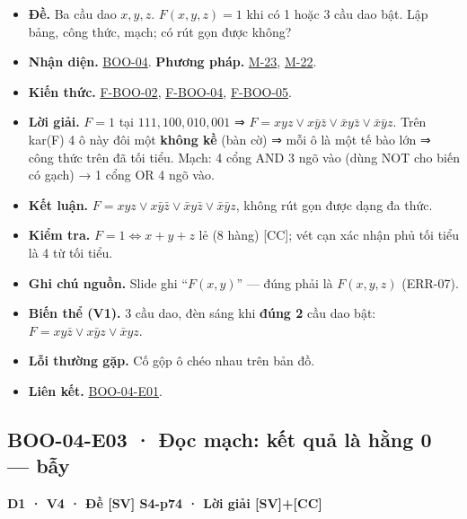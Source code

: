 \documentclass[
  10pt,
  twoside,openany]{book}
\providecommand{\tightlist}{%
  \setlength{\itemsep}{0pt}\setlength{\parskip}{0pt}}
\begin{document}
\begin{itemize}
\tightlist
\item
  \textbf{Đề.} Ba cầu dao \(x,y,z\). \(F(x,y,z)=1\) khi có 1 hoặc 3 cầu
  dao bật. Lập bảng, công thức, mạch; có rút gọn được không?
\item
  \textbf{Nhận diện.} \protect\hyperlink{BOO-04}{BOO-04}. \textbf{Phương
  pháp.} \protect\hyperlink{M-23}{M-23}, \protect\hyperlink{M-22}{M-22}.
\item
  \textbf{Kiến thức.} \protect\hyperlink{F-BOO-02}{F-BOO-02},
  \protect\hyperlink{F-BOO-04}{F-BOO-04},
  \protect\hyperlink{F-BOO-05}{F-BOO-05}.
\item
  \textbf{Lời giải.} \(F=1\) tại \(111,100,010,001\) ⇒
  \(F=xyz\vee x\bar y\bar z\vee\bar xy\bar z\vee\bar x\bar yz\). Trên
  kar(F) 4 ô này đôi một \textbf{không kề} (bàn cờ) ⇒ mỗi ô là một tế
  bào lớn ⇒ công thức trên đã tối tiểu. Mạch: 4 cổng AND 3 ngõ vào (dùng
  NOT cho biến có gạch) → 1 cổng OR 4 ngõ vào.
\item
  \textbf{Kết luận.}
  \(F=xyz\vee x\bar y\bar z\vee\bar xy\bar z\vee\bar x\bar yz\), không
  rút gọn được dạng đa thức.
\item
  \textbf{Kiểm tra.} \(F=1\Leftrightarrow x+y+z\) lẻ (8 hàng) {[}CC{]};
  vét cạn xác nhận phủ tối tiểu là 4 từ tối tiểu.
\item
  \textbf{Ghi chú nguồn.} Slide ghi ``\(F(x,y)\)'' --- đúng phải là
  \(F(x,y,z)\) (ERR-07).
\item
  \textbf{Biến thể (V1).} 3 cầu dao, đèn sáng khi \textbf{đúng 2} cầu
  dao bật: \(F=xy\bar z\vee x\bar yz\vee\bar xyz\).
\item
  \textbf{Lỗi thường gặp.} Cố gộp ô chéo nhau trên bản đồ.
\item
  \textbf{Liên kết.} \protect\hyperlink{BOO-04-E01}{BOO-04-E01}.
\end{itemize}

\hypertarget{BOO-04-E03}{%
\subsection{BOO-04-E03 · Đọc mạch: kết quả là hằng 0 ---
bẫy}\label{BOO-04-E03}}

\textbf{D1 · V4 · Đề {[}SV{]} S4-p74 · Lời giải {[}SV{]}+{[}CC{]}}
\end{document}
